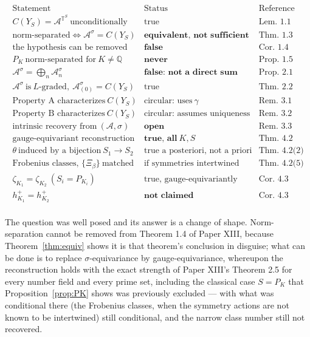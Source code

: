 \documentclass[11pt]{amsart}
\numberwithin{equation}{section}
\theoremstyle{definition}
\theoremstyle{remark}
\newcommand{\Q}{\mathbb{Q}}
\newcommand{\T}{\mathbb{T}}
\newcommand{\cA}{\mathcal{A}}
\begin{document}
\[
\begin{array}{lll}
\text{Statement} & \text{Status} & \text{Reference}\\\hline
C(Y_S)=\cA^{\T^S}\ \text{unconditionally} & \text{true} & \text{Lem.~1.1}\\
\text{norm-separated}\iff\cA^\sigma=C(Y_S) & \textbf{equivalent, not sufficient} & \text{Thm.~1.3}\\
\text{the hypothesis can be removed} & \textbf{false} & \text{Cor.~1.4}\\
P_K\ \text{norm-separated for}\ K\ne\Q & \textbf{never} & \text{Prop.~1.5}\\
\cA^\sigma=\bigoplus_n\cA^\sigma_n & \textbf{false: not a direct sum} & \text{Prop.~2.1}\\
\cA^\sigma\ \text{is}\ L\text{-graded},\ \cA^\sigma_{(0)}=C(Y_S) & \text{true} & \text{Thm.~2.2}\\
\text{Property A characterizes}\ C(Y_S) & \text{circular: uses}\ \gamma & \text{Rem.~3.1}\\
\text{Property B characterizes}\ C(Y_S) & \text{circular: assumes uniqueness} & \text{Rem.~3.2}\\
\text{intrinsic recovery from}\ (\cA,\sigma) & \textbf{open} & \text{Rem.~3.3}\\
\text{gauge-equivariant reconstruction} & \textbf{true, all}\ K,S & \text{Thm.~4.2}\\
\theta\ \text{induced by a bijection}\ S_1\to S_2 & \text{true a posteriori, not a priori} & \text{Thm.~4.2(2)}\\
\text{Frobenius classes, }\{\Xi_\beta\}\ \text{matched} & \text{if symmetries intertwined} & \text{Thm.~4.2(5)}\\
\zeta_{K_1}=\zeta_{K_2}\ (S_i=P_{K_i}) & \text{true, gauge-equivariantly} & \text{Cor.~4.3}\\
h^+_{K_1}=h^+_{K_2} & \textbf{not claimed} & \text{Cor.~4.3}\\
\end{array}
\]

The question was well posed and its answer is a change of shape. Norm-separation cannot be
removed from Theorem 1.4 of Paper XIII, because Theorem~\ref{thm:equiv} shows it is that
theorem's conclusion in disguise; what can be done is to replace $\sigma$-equivariance by
gauge-equivariance, whereupon the reconstruction holds with the exact strength of Paper
XIII's Theorem 2.5 for every number field and every prime set, including the classical case
$S=P_K$ that Proposition~\ref{prop:PK} shows was previously excluded --- with what was
conditional there (the Frobenius classes, when the symmetry actions are not known to be
intertwined) still conditional, and the narrow class number still not recovered.
\end{document}
